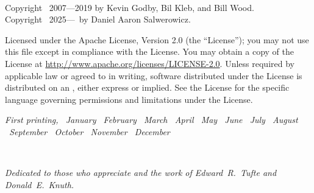 \documentclass[a4paper]{tufte-book}
\makeatletter
\newcommand{\monthAndYear}{\DTMenglishmonthname{\@dtm@month} \@dtm@year}
\renewcommand{\monthAndYear}{%
      \ifcase\month%
        \or\ January%
        \or\ February%
        \or\ March%
        \or\ April%
        \or\ May%
        \or\ June%
        \or\ July%
        \or\ August%
        \or\ September%
        \or\ October%
        \or\ November%
        \or\ December%
      \fi\space\number\year%
    }
\makeatother
\begin{document}
\newpage
\begin{fullwidth}
~\vfill
\thispagestyle{empty}
\setlength{\parindent}{0pt}
\setlength{\parskip}{\baselineskip}

Copyright \textcopyright\ 2007---2019 by Kevin Godby, Bil Kleb, and Bill Wood.\\
Copyright \textcopyright\ 2025---\the\year\ by Daniel Aaron Salwerowicz.

\par{}

\par{}

\par
Licensed under the Apache License, Version 2.0 (the ``License''); you may not
use this file except in compliance with the License. You may obtain a copy
of the License at \url{http://www.apache.org/licenses/LICENSE-2.0}. Unless
required by applicable law or agreed to in writing, software distributed
under the License is distributed on an , either express or implied. See the
License for the specific language governing permissions and limitations
under the License.

\par\textit{First printing, \monthAndYear}
\end{fullwidth}


\tableofcontents


\listoffigures


\listoftables


\cleardoublepage{}
~\vfill
\begin{doublespace}
  \noindent\fontsize{18}{22}\selectfont\itshape\nohyphenation%
  Dedicated to those who appreciate  and the work of 
  \mbox{Edward R.~Tufte} and \mbox{Donald E.~Knuth}.
\end{doublespace}
\end{document}
